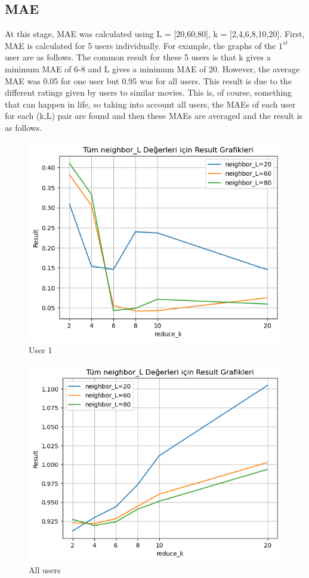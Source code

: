\documentclass[conference]{IEEEtran}
\begin{document}
\subsection {MAE}
At this stage, MAE was calculated using L = [20,60,80], k = [2,4,6,8,10,20]. First, MAE is calculated for 5 users individually. For example, the graphs of the $1^{st}$ user are as follows. The common result for these 5 users is that k gives a minimum MAE of 6-8 and L gives a minimum MAE of 20. However, the average MAE was 0.05 for one user but 0.95 was for all users. This result is due to the different ratings given by users to similar movies. This is, of course, something that can happen in life, so taking into account all users, the MAEs of each user for each (k,L) pair are found and then these MAEs are averaged and the result is as follows.
\begin{figure}[htbp]
\centerline{\includegraphics[scale = 0.5]{user1.png}}
\caption{User 1}
\label{fig}
\end{figure}
\begin{figure}[htbp]
\centerline{\includegraphics[scale = 0.5]{user_all.png}}
\caption{All users}
\label{fig}
\end{figure}
\end{document}
